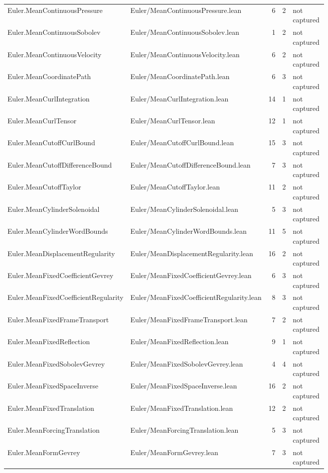 \documentclass[10pt]{article}
\begin{document}
\begin{longtable}{p{0.28\linewidth}p{0.27\linewidth}r r p{0.20\linewidth}}
Euler.MeanContinuousPressure & Euler/MeanContinuousPressure.lean & 6 & 2 & not captured\\
Euler.MeanContinuousSobolev & Euler/MeanContinuousSobolev.lean & 1 & 2 & not captured\\
Euler.MeanContinuousVelocity & Euler/MeanContinuousVelocity.lean & 6 & 2 & not captured\\
Euler.MeanCoordinatePath & Euler/MeanCoordinatePath.lean & 6 & 3 & not captured\\
Euler.MeanCurlIntegration & Euler/MeanCurlIntegration.lean & 14 & 1 & not captured\\
Euler.MeanCurlTensor & Euler/MeanCurlTensor.lean & 12 & 1 & not captured\\
Euler.MeanCutoffCurlBound & Euler/MeanCutoffCurlBound.lean & 15 & 3 & not captured\\
Euler.MeanCutoffDifferenceBound & Euler/MeanCutoffDifferenceBound.lean & 7 & 3 & not captured\\
Euler.MeanCutoffTaylor & Euler/MeanCutoffTaylor.lean & 11 & 2 & not captured\\
Euler.MeanCylinderSolenoidal & Euler/MeanCylinderSolenoidal.lean & 5 & 3 & not captured\\
Euler.MeanCylinderWordBounds & Euler/MeanCylinderWordBounds.lean & 11 & 5 & not captured\\
Euler.MeanDisplacementRegularity & Euler/MeanDisplacementRegularity.lean & 16 & 2 & not captured\\
Euler.MeanFixedCoefficientGevrey & Euler/MeanFixedCoefficientGevrey.lean & 6 & 3 & not captured\\
Euler.MeanFixedCoefficientRegularity & Euler/MeanFixedCoefficientRegularity.lean & 8 & 3 & not captured\\
Euler.MeanFixedFrameTransport & Euler/MeanFixedFrameTransport.lean & 7 & 2 & not captured\\
Euler.MeanFixedReflection & Euler/MeanFixedReflection.lean & 9 & 1 & not captured\\
Euler.MeanFixedSobolevGevrey & Euler/MeanFixedSobolevGevrey.lean & 4 & 4 & not captured\\
Euler.MeanFixedSpaceInverse & Euler/MeanFixedSpaceInverse.lean & 16 & 2 & not captured\\
Euler.MeanFixedTranslation & Euler/MeanFixedTranslation.lean & 12 & 2 & not captured\\
Euler.MeanForcingTranslation & Euler/MeanForcingTranslation.lean & 5 & 3 & not captured\\
Euler.MeanFormGevrey & Euler/MeanFormGevrey.lean & 7 & 3 & not captured\\

\end{longtable}
\end{document}
